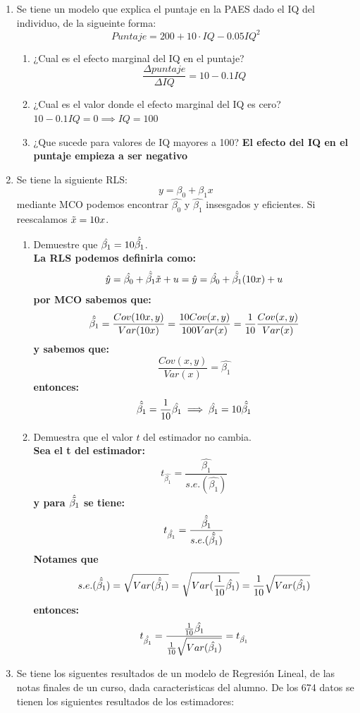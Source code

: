\documentclass[10pt,a4paper]{article}
\begin{document}
\begin{enumerate}
\item Se tiene un modelo que explica el puntaje en la PAES dado el IQ del individuo, de la sigueinte forma:
$$Puntaje = 200 + 10 \cdot IQ -  0.05IQ^2$$
\begin{enumerate}
    \item ¿Cual es el efecto marginal del IQ en el puntaje?
    \textbf{$$\frac{\Delta puntaje}{\Delta IQ} = 10-0.1IQ$$ }
    \item ¿Cual es el valor donde el efecto marginal del IQ es cero?
    \textbf{$10-0.1IQ=0 \implies IQ = 100$}
    \item ¿Que sucede para valores de IQ mayores a 100?
    \textbf{El efecto del IQ en el puntaje empieza a ser negativo}
\end{enumerate}

\item Se tiene la siguiente RLS:
$$y = \beta_0 + \beta_1x$$
mediante MCO podemos encontrar $\hat{\beta_0}$ y $\hat{\beta_1}$ insesgados y eficientes. Si reescalamos $\Tilde{x} = 10x$. 
\begin{enumerate}
    \item Demuestre que $\hat{\beta_1}=10\hat{\Tilde{\beta_1}}$. \\
    \textbf{La RLS podemos definirla como:
    $$\hat{y} = \hat{\beta_0} + \hat{\Tilde{\beta_1}}\Tilde{x}+u = \hat{y} = \hat{\beta_0} + \hat{\Tilde{\beta_1}}(10x)+u$$
    por MCO sabemos que:
    $$\hat{\Tilde{\beta_1}}=\frac{Cov(10x,y)}{Var(10x)}=\frac{10Cov(x,y)}{100Var(x)}=\frac{1}{10}\frac{Cov(x,y)}{Var(x)}$$
    y sabemos que:
    $$\frac{Cov(x,y)}{Var(x)} = \hat{\beta_1}$$
    entonces:
    $$\hat{\Tilde{\beta_1}} = \frac{1}{10}\hat{\beta_1} \implies \hat{\beta_1} = 10\hat{\Tilde{\beta_1}}$$}
\item Demuestra que el valor $t$ del estimador no cambia. \\
\textbf{ Sea el t del estimador:
$$t_{\hat{\beta_1}} = \frac{\hat{\beta_1}}{s.e.(\hat{\beta_1})}$$
y para $\hat{\Tilde{\beta_1}}$ se tiene:
$$t_{\hat{\Tilde{\beta_1}}} = \frac{\hat{\Tilde{\beta_1}}}{s.e.(\hat{\Tilde{\beta_1}})}$$
Notames que 
$$s.e.(\hat{\Tilde{\beta_1}}) = \sqrt{Var(\hat{\Tilde{\beta_1}})}=\sqrt{Var(\frac{1}{10}\hat{{\beta_1}})}=\frac{1}{10}\sqrt{Var(\hat{{\beta_1}})}$$
entonces:
$$t_{\hat{\Tilde{\beta_1}}} = \frac{\frac{1}{10}\hat{{\beta_1}}}{\frac{1}{10}\sqrt{Var(\hat{{\beta_1}})}} = t_{\hat{\beta_1}}$$
}
    
\end{enumerate}

\item Se tiene los siguentes resultados de un modelo de Regresión Lineal, de las notas finales de un curso, dada caracteristicas del alumno. De los 674 datos se tienen los siguientes resultados de los estimadores:


\end{enumerate}
\end{document}
